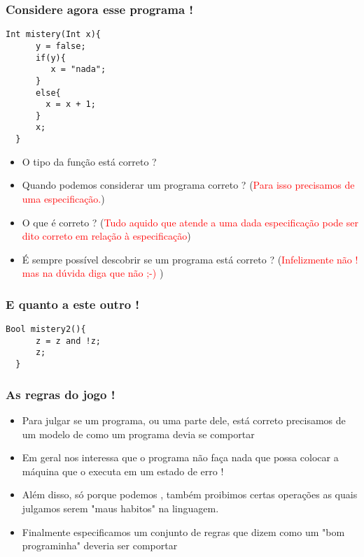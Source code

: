 \documentclass{beamer}
\begin{document}
\begin{frame}[fragile]
   \frametitle{Considere agora esse programa !}
\begin{lstlisting}[style=ast,escapechar=@]
  Int mistery(Int x){
      y = false;
      if(y){
         x = "nada";
      }
      else{
        x = x + 1; 
      }
      x;
  }
\end{lstlisting}
   \begin{itemize}
      \item O tipo da função está correto ?
      \pause
      \item Quando podemos considerar um programa correto ?  (\textcolor{red}{Para isso precisamos de uma especificação.}) 
      \pause
      \item O que é correto ?  (\textcolor{red}{Tudo aquido que atende a uma dada especificação pode ser dito correto em relação à especificação}) 
      \pause
      \item É sempre possível descobrir se um programa está correto ? (\textcolor{red}{Infelizmente não ! mas na dúvida diga que não ;-) } ) 
   \end{itemize}

\end{frame}


\begin{frame}[fragile]
   \frametitle{E quanto a este outro !}
\begin{lstlisting}[style=ast,escapechar=@]
  Bool mistery2(){
      z = z and !z;
      z;
  }
\end{lstlisting}

\end{frame}


\begin{frame}[fragile]
   \frametitle{As regras do jogo !}
  \begin{itemize}
   \item Para julgar se um programa, ou uma parte dele, está correto precisamos de um modelo de como um programa devia se comportar
   \item Em geral nos interessa que o programa não faça nada que possa colocar a máquina que o executa em um estado de erro !
   \item Além disso, só porque podemos , também proibimos certas operações as quais julgamos serem "maus habitos" na linguagem.
   \item Finalmente especificamos um conjunto de regras que dizem como um "bom programinha" deveria ser comportar
  \end{itemize}

\end{frame}
\end{document}
